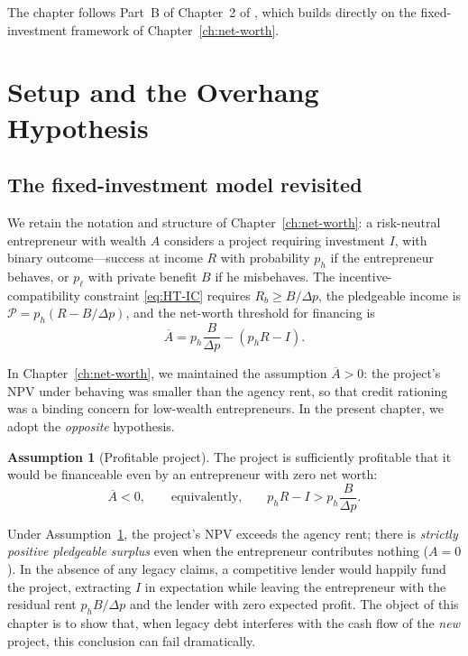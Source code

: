 \documentclass[11pt,a4paper,oneside]{book}
\def\geq{\geqslant}
\theoremstyle{plain}
\theoremstyle{definition}
\newtheorem{assumption}[theorem]{Assumption}
\theoremstyle{remark}
\numberwithin{equation}{chapter}
\begin{document}
The chapter follows Part~B of Chapter~2 of \citet{Tirole2006}, which builds directly on the fixed-investment framework of Chapter~\ref{ch:net-worth}.

\section{Setup and the Overhang Hypothesis}
\label{sec:DO-setup}

\subsection{The fixed-investment model revisited}

We retain the notation and structure of Chapter~\ref{ch:net-worth}: a risk-neutral entrepreneur with wealth $A$ considers a project requiring investment $I$, with binary outcome---success at income $R$ with probability $p_h$ if the entrepreneur behaves, or $p_\ell$ with private benefit $B$ if he misbehaves.
The incentive-compatibility constraint \eqref{eq:HT-IC} requires $R_b \geq B/\Delta p$, the pledgeable income is $\mathcal{P} = p_h(R - B/\Delta p)$, and the net-worth threshold for financing is
\begin{equation*}
  \overline{A} = p_h \frac{B}{\Delta p} - (p_h R - I).
\end{equation*}

In Chapter~\ref{ch:net-worth}, we maintained the assumption $\overline{A} > 0$: the project's NPV under behaving was smaller than the agency rent, so that credit rationing was a binding concern for low-wealth entrepreneurs.
In the present chapter, we adopt the \emph{opposite} hypothesis.

\begin{assumption}[Profitable project]\label{ass:DO-profitable}
The project is sufficiently profitable that it would be financeable even by an entrepreneur with zero net worth:
\begin{equation}\label{eq:DO-profitable}
  \overline{A} < 0,
  \qquad \text{equivalently,} \qquad
  p_h R - I > p_h \frac{B}{\Delta p}.
\end{equation}
\end{assumption}

Under Assumption~\ref{ass:DO-profitable}, the project's NPV exceeds the agency rent; there is \emph{strictly positive pledgeable surplus} even when the entrepreneur contributes nothing ($A = 0$).
In the absence of any legacy claims, a competitive lender would happily fund the project, extracting $I$ in expectation while leaving the entrepreneur with the residual rent $p_h B / \Delta p$ and the lender with zero expected profit.
The object of this chapter is to show that, when legacy debt interferes with the cash flow of the \emph{new} project, this conclusion can fail dramatically.
\end{document}
